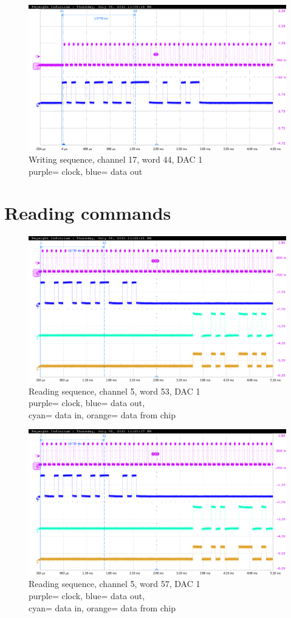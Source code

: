 \begin{figure}[H]
	\centering
	\includegraphics[width=0.6\linewidth]{IMG/ch5/probe/09-08-2021_ch17-write44-baselinedac1}
	\caption{Writing sequence, channel 17, word 44, DAC 1\\{\color{magenta}purple}= clock, {\color{blue}blue}= data out}
	\label{fig:ch17write44}
\end{figure}
\section{Reading commands}
\begin{figure}[H]
	\centering
	\includegraphics[width=0.6\linewidth]{IMG/ch5/probe/09-08-2021_ch05-read53-baselinedac1}
	\caption{Reading sequence, channel 5, word 53, DAC 1\\{\color{magenta}purple}= clock, {\color{blue}blue}= data out,\\{\color{cyan}cyan}= data in, {\color{orange}orange}= data from chip}
	\label{fig:ch05write53}
\end{figure}
\begin{figure}[H]
	\centering
	\includegraphics[width=0.6\linewidth]{IMG/ch5/probe/09-08-2021_ch05-read57-baselinedac1}
	\caption{Reading sequence, channel 5, word 57, DAC 1\\{\color{magenta}purple}= clock, {\color{blue}blue}= data out,\\{\color{cyan}cyan}= data in, {\color{orange}orange}= data from chip}
	\label{fig:ch05write57}
\end{figure}

